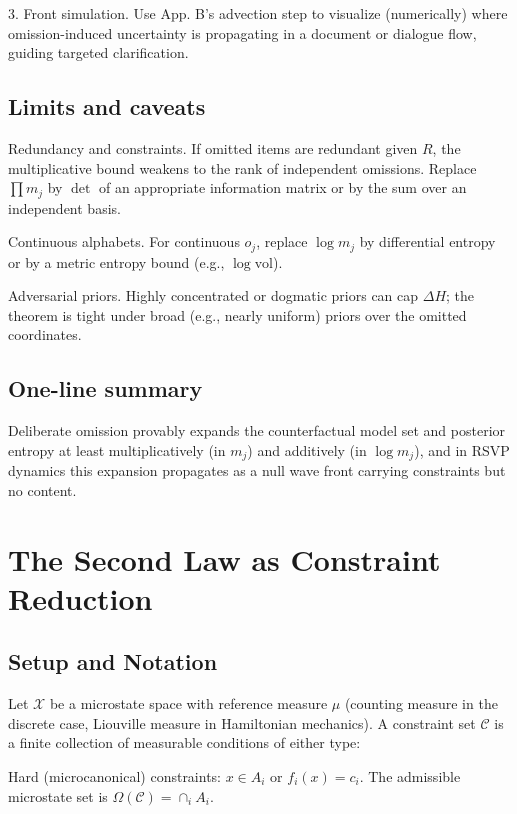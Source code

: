 \documentclass{article}
\begin{document}
3. Front simulation. Use App. B’s advection step to visualize (numerically) where omission-induced uncertainty is propagating in a document or dialogue flow, guiding targeted clarification.

\subsection{Limits and caveats}

Redundancy and constraints. If omitted items are redundant given $R$, the multiplicative bound weakens to the rank of independent omissions. Replace $\prod m_j$ by $\det$ of an appropriate information matrix or by the sum over an independent basis.

Continuous alphabets. For continuous $o_j$, replace $\log m_j$ by differential entropy or by a metric entropy bound (e.g., $\log \mathrm{vol}$).

Adversarial priors. Highly concentrated or dogmatic priors can cap $\Delta H$; the theorem is tight under broad (e.g., nearly uniform) priors over the omitted coordinates.

\subsection{One-line summary}

Deliberate omission provably expands the counterfactual model set and posterior entropy at least multiplicatively (in $m_j$) and additively (in $\log m_j$), and in RSVP dynamics this expansion propagates as a null wave front carrying constraints but no content.

\section{The Second Law as Constraint Reduction} \label{app:D}

\subsection{Setup and Notation}

Let $\mathcal{X}$ be a microstate space with reference measure $\mu$ (counting measure in the discrete case, Liouville measure in Hamiltonian mechanics).
A constraint set $\mathcal{C}$ is a finite collection of measurable conditions of either type:

Hard (microcanonical) constraints: $x\in A_i$ or $f_i(x)=c_i$.
The admissible microstate set is $\Omega(\mathcal{C})=\cap_i A_i$.
\end{document}
